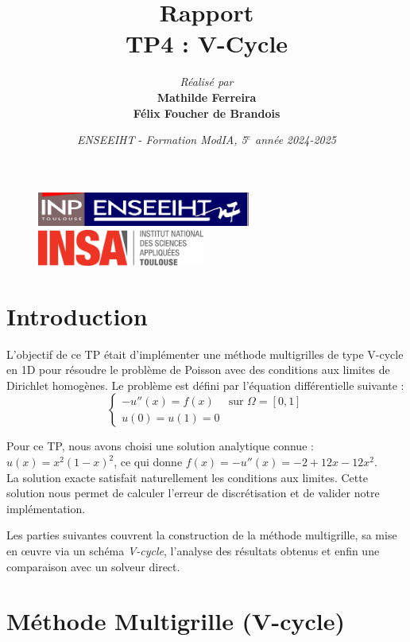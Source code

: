 \documentclass[12pt,a4paper]{article}
\title{\vspace{4cm}
        Rapport \\
        \vspace{1cm} \textbf{TP4 : V-Cycle} \\ 
        \vspace{4cm} 
}
\author{\textit{Réalisé par} \vspace{0.5cm}\\
         \textbf{Mathilde Ferreira} \\
        \textbf{Félix Foucher de Brandois}
}
\date{\vfill
        \textit{ENSEEIHT} - 
        \textit{Formation ModIA, 5$^{e}$ année}
        \hfill
        \textit{2024-2025} \\
        \vspace{1cm}
}
\begin{document}
\begin{figure}[t]
    \centering
    \includegraphics[width=7cm]{src/inp_n7.png}
    \hfill
    \includegraphics[width=5.5cm]{src/insa_toulouse.png}
\end{figure}


\maketitle
\thispagestyle{empty}

\newpage


\section{Introduction}

L'objectif de ce TP était d'implémenter une méthode multigrilles de type V-cycle en 1D pour résoudre le problème de Poisson avec des conditions aux limites de Dirichlet homogènes.
Le problème est défini par l'équation différentielle suivante :
\begin{equation}
    \begin{cases}
        -u''(x) = f(x) & \text{sur } \Omega = [0, 1] \\
        u(0) = u(1) = 0
    \end{cases}
\end{equation}

Pour ce TP, nous avons choisi une solution analytique connue : $u(x) = x^2(1 - x)^2$, ce qui donne $f(x) = -u''(x) = -2 + 12x - 12x^2$. \\
La solution exacte satisfait naturellement les conditions aux limites.
Cette solution nous permet de calculer l'erreur de discrétisation et de valider notre implémentation.

Les parties suivantes couvrent la construction de la méthode multigrille, sa mise en œuvre via un schéma \textit{V-cycle}, l’analyse des résultats obtenus et enfin une comparaison avec un solveur direct.

\section{Méthode Multigrille (V-cycle)}
\end{document}
